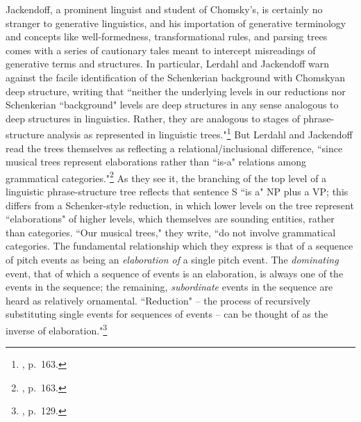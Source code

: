 Jackendoff, a prominent linguist and student of Chomsky's, is certainly no stranger to generative linguistics, and his importation of generative terminology and concepts like well-formedness, transformational rules, and parsing trees comes with a series of cautionary tales meant to intercept misreadings of generative terms and structures.  In particular, Lerdahl and Jackendoff warn against the facile identification of the Schenkerian background with Chomskyan deep structure, writing that ``neither the underlying levels in our reductions nor Schenkerian ``background" levels are deep structures in any sense analogous to deep structures in linguistics.  Rather, they are analogous to stages of phrase-structure analysis as represented in linguistic trees."\footnote{\cite{lj1977}, p.\ 163.}  But Lerdahl and Jackendoff read the trees themselves as reflecting a relational/inclusional difference, ``since musical trees represent elaborations rather than ``is-a" relations among grammatical categories."\footnote{\cite{lj1977}, p.\ 163.}  As they see it, the branching of the top level of a linguistic phrase-structure tree reflects that sentence S ``is a" NP plus a VP; this differs from a Schenker-style reduction, in which lower levels on the tree represent ``elaborations" of higher levels, which themselves are sounding entities, rather than categories.  ``Our musical trees," they write, ``do not involve grammatical categories.  The fundamental relationship which they express is that of a sequence of pitch events as being an \emph{elaboration of} a single pitch event.  The \emph{dominating} event, that of which a sequence of events is an elaboration, is always one of the events in the sequence; the remaining, \emph{subordinate} events in the sequence are heard as relatively ornamental.  ``Reduction" -- the process of recursively substituting single events for sequences of events -- can be thought of as the inverse of elaboration."\footnote{\cite{lj1977}, p.\ 129.}

